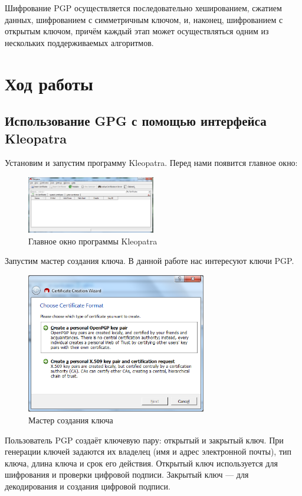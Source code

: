 Шифрование PGP осуществляется последовательно хешированием, сжатием данных, шифрованием с симметричным ключом, и, наконец, шифрованием с открытым ключом, причём каждый этап может осуществляться одним из нескольких поддерживаемых алгоритмов. 

\newpage
\section{Ход работы}
\subsection{Использование GPG с помощью интерфейса Kleopatra}

Установим и запустим программу Kleopatra. Перед нами появится главное окно:

\begin{figure}[!ht]
	\centering
	\includegraphics[width=0.5\textwidth]{images/1.png}
	\caption{Главное окно программы Kleopatra}
\end{figure}

Запустим мастер создания ключа. В данной работе нас интересуют ключи PGP.

\begin{figure}[!ht]
	\centering
	\includegraphics[width=0.7\textwidth]{images/2.png}
	\caption{Мастер создания ключа}
\end{figure}

Пользователь PGP создаёт ключевую пару: открытый и закрытый ключ. При генерации ключей задаются их владелец (имя и адрес электронной почты), тип ключа, длина ключа и срок его действия. 
Открытый ключ используется для шифрования и проверки цифровой подписи. Закрытый ключ — для декодирования и создания цифровой подписи.

